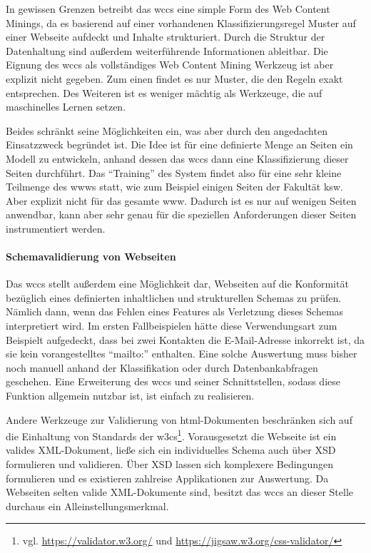         In gewissen Grenzen betreibt das \gls{wccs} eine simple Form des Web Content Minings,
        da es basierend auf einer vorhandenen Klassifizierungsregel
        Muster auf einer Webseite aufdeckt und Inhalte strukturiert.
        Durch die Struktur der Datenhaltung sind außerdem weiterführende Informationen ableitbar.
        Die Eignung des \gls{wccs} als vollständiges Web Content Mining Werkzeug ist
        aber explizit nicht gegeben.
        Zum einen findet es nur Muster, die den Regeln exakt entsprechen.
        Des Weiteren ist es weniger mächtig als Werkzeuge,
        die auf maschinelles Lernen setzen.
        
        Beides schränkt seine Möglichkeiten ein,
        was aber durch den angedachten Einsatzzweck begründet ist.
        Die Idee ist für eine definierte Menge an Seiten ein Modell zu entwickeln,
        anhand dessen das \gls{wccs} dann eine Klassifizierung dieser Seiten durchführt.
        Das "`Training"' des System findet also für eine sehr kleine Teilmenge des \glspl{www} statt,
        wie zum Beispiel einigen Seiten der Fakultät \gls{ksw}.
        Aber explizit nicht für das gesamte \gls{www}.
        Dadurch ist es nur auf wenigen Seiten anwendbar,
        kann aber sehr genau für die speziellen Anforderungen dieser Seiten instrumentiert werden.      

        \paragraph{Schemavalidierung von Webseiten}
        Das \gls{wccs} stellt außerdem eine Möglichkeit dar,
        Webseiten auf die Konformität bezüglich eines definierten
        inhaltlichen und strukturellen Schemas zu prüfen.
        Nämlich dann, wenn das Fehlen eines Features als Verletzung
        dieses Schemas interpretiert wird.
        Im ersten Fallbeispielen hätte diese Verwendungsart zum Beispielt aufgedeckt,
        dass bei zwei Kontakten die E-Mail-Adresse inkorrekt ist,
        da sie kein vorangestelltes "`mailto:"' enthalten.
        Eine solche Auswertung muss bisher noch manuell anhand der Klassifikation
        oder durch Datenbankabfragen geschehen.
        Eine Erweiterung des \gls{wccs} und seiner Schnittstellen,
        sodass diese Funktion allgemein nutzbar ist,
        ist einfach zu realisieren.

        Andere Werkzeuge zur Validierung von \gls{html}-Dokumenten
        beschränken sich auf die Einhaltung von Standards der
        \glspl{w3c}\footnote{vgl. \url{https://validator.w3.org/} und \url{https://jigsaw.w3.org/css-validator/}}.
        Vorausgesetzt die Webseite ist ein valides XML-Dokument,
        ließe sich ein individuelles Schema auch über XSD formulieren und validieren.
        Über XSD lassen sich komplexere Bedingungen formulieren und es existieren
        zahlreise Applikationen zur Auswertung.
        Da Webseiten selten valide XML-Dokumente sind,
        besitzt das \gls{wccs} an dieser Stelle durchaus
        ein Alleinstellungsmerkmal.